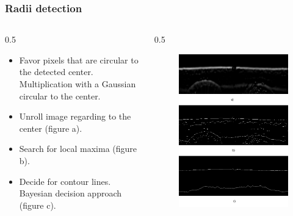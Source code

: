 \documentclass{beamer}
\begin{document}
\begin{frame}
    [fragile] \frametitle{Radii detection}
    \begin{columns}
        \begin{column}
            {0.5
            \textwidth}
            \begin{itemize}
                \item Favor pixels that are circular to the detected center. Multiplication with a Gaussian circular to the center.
                \item Unroll image regarding to the center (figure a).
                \item Search for local maxima (figure b).
                \item Decide for contour lines. Bayesian decision approach (figure c).
            \end{itemize}
        \end{column}
        \begin{column}
            {0.5
            \textwidth}
            \begin{figure}
                [ht] \centering
                \includegraphics[width=0.89
                \textwidth]{../report/iris/unrolled.png} \label{fig:hough_impl}
            \end{figure}
        \end{column}
    \end{columns}
\end{frame}
\end{document}
